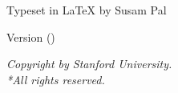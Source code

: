 \documentclass{article}
\title{\thetitle}
\author{\theauthors}
\date{}
\newcommand{\ifmini}[2]{\ifdefined\mini#1\else#2\fi}
\newcommand{\copyrightnotice}{
    \medskip
    \textit{Copyright \textcopyright{} \published{} by Stanford University.
            \ifmini{\\*}{}All rights reserved.}
}
\begin{document}
\maketitle
\begin{center}
\small
Typeset in \LaTeX{} by Susam Pal

Version \version{} (\updated)
\end{center}
\newpage

{
    \ifmini{\small}{}
    \tableofcontents
}
\copyrightnotice
\newpage
{}
\end{document}
